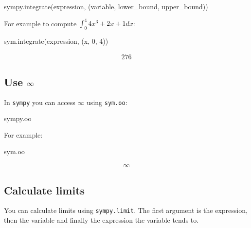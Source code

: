 \begin{pyin}
sympy.integrate(expression, (variable, lower_bound, upper_bound))
\end{pyin}



For example to compute \(\int_0^4 4x^3 + 2x + 1 dx\):




\begin{pyin}
sym.integrate(expression, (x, 0, 4))
\end{pyin}




\begin{equation*}
\begin{split}\displaystyle 276\end{split}
\end{equation*}




\subsection{Use \(\infty\protect\)}
\label{\detokenize{tools-for-mathematics/03-calculus/how/main:use-infty}}

In \texttt{sympy} you can access \(\infty\) using \texttt{sym.oo}:


\begin{pyin}
sympy.oo
\end{pyin}



For example:




\begin{pyin}
sym.oo
\end{pyin}




\begin{equation*}
\begin{split}\displaystyle \infty\end{split}
\end{equation*}




\subsection{Calculate limits}
\label{\detokenize{tools-for-mathematics/03-calculus/how/main:calculate-limits}}

You can calculate limits using \texttt{sympy.limit}. The first argument is the
expression, then the variable and finally the expression the variable tends to.


